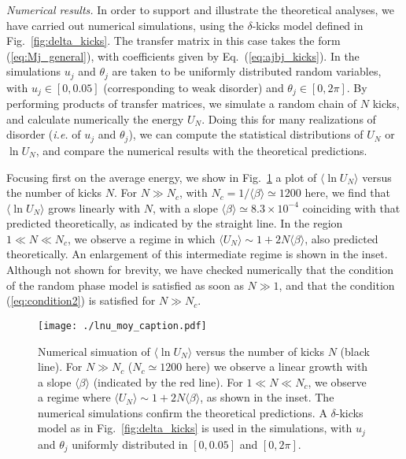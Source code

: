 \documentclass[ prl, twocolumn, superscriptaddress, amsfonts, amsmath,floatfix]{revtex4-1}
\begin{document}
{\it Numerical results.}
In order to support and illustrate the theoretical analyses, we have carried out numerical simulations, using the $\delta$-kicks model defined in Fig.~\ref{fig:delta_kicks}. The transfer matrix in this case takes the form (\ref{eq:Mj_general}), with coefficients given by Eq.~(\ref{eq:ajbj_kicks}). In the simulations $u_j$ and $\theta_j$ are taken to be uniformly distributed random variables, with $u_j\in[0,0.05]$ (corresponding to weak disorder) and $\theta_j\in [0,2\pi]$. By performing products of transfer matrices, we simulate a random chain of $N$ kicks, and calculate numerically the energy $U_N$. Doing this for many realizations of disorder ({\it i.e.} of $u_j$ and $\theta_j$), we can compute the statistical distributions of $U_N$ or $\ln U_N$, and compare the numerical results with the theoretical predictions. 

Focusing first on the average energy, we show in Fig.~\ref{fig:lnU} a plot of $\langle \ln U_N \rangle$ versus the number of kicks $N$. For $N \gg N_c$, with $N_c=1/\langle \beta \rangle \simeq 1200$ here, we find that $\langle \ln U_N \rangle$ grows linearly with $N$, with a slope $\langle \beta \rangle \simeq 8.3 \times 10^{-4}$ coinciding with that predicted theoretically, as indicated by the straight line. In the region $1 \ll N \ll N_c$, we observe a regime in which $\langle U_N \rangle \sim 1+ 2 N \langle \beta \rangle$, also predicted theoretically. An enlargement of this intermediate regime is shown in the inset. Although not shown for brevity, we have checked numerically that the condition of the random phase model is satisfied as soon as $N \gg 1$, and that the condition (\ref{eq:condition2}) is satisfied for $N \gg N_c$. 
%
\begin{figure}[h]
     \begin{center}
     \texttt{[image: ./lnu\_moy\_caption.pdf]}
     \end{center}    
     \caption{\label{fig:lnU} Numerical simuation of $\langle \ln U_N \rangle$ versus the number of kicks $N$ (black line). For $N \gg N_c$ ($N_c \simeq 1200$ here) we observe a linear growth with a slope $\langle \beta \rangle$ (indicated by the red line). For $1 \ll N \ll N_c$, we observe a regime where $\langle U_N \rangle \sim 1+2N \langle \beta \rangle$, as shown in the inset. The numerical simulations confirm the theoretical predictions. A $\delta$-kicks model as in Fig.~\ref{fig:delta_kicks} is used in the simulations, with $u_j$ and $\theta_j$ uniformly distributed in $[0,0.05]$ and $[0,2\pi]$.
            }
\end{figure}
%
\end{document}
